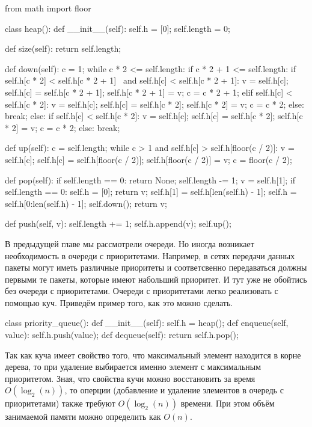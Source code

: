 \begin{python}
from math import floor

class heap():
	def __init__(self):
		self.h = [0];
		self.length = 0;

	def size(self):
		return self.length;

	def down(self):
		c = 1;
		while c * 2 <= self.length:
			if c * 2 + 1 <= self.length:
				if self.h[c * 2] < self.h[c * 2 + 1] \
					and self.h[c] < self.h[c * 2 + 1]:
					v = self.h[c];
					self.h[c] = self.h[c * 2 + 1];
					self.h[c * 2 + 1] = v;
					c = c * 2 + 1;
				elif self.h[c] < self.h[c * 2]:
					v = self.h[c];
					self.h[c] = self.h[c * 2];
					self.h[c * 2] = v;
					c = c * 2;
				else:
					break;
			else:
				if self.h[c] < self.h[c * 2]:
					v = self.h[c];
					self.h[c] = self.h[c * 2];
					self.h[c * 2] = v;
					c = c * 2;
				else:
					break;

	def up(self):
		c = self.length;
		while c > 1 and self.h[c] > self.h[floor(c / 2)]:
			v = self.h[c];
			self.h[c] = self.h[floor(c / 2)];
			self.h[floor(c / 2)] = v;
			c = floor(c / 2);

	def pop(self):
		if self.length == 0:
			return None;
		self.length -= 1;
		v = self.h[1];
		if self.length == 0:
			self.h = [0];
			return v;
		self.h[1] = self.h[len(self.h) - 1];
		self.h = self.h[0:len(self.h) - 1];
		self.down();
		return v;

	def push(self, v):
		self.length += 1;
		self.h.append(v);
		self.up();
\end{python}

В предыдущей главе мы рассмотрели очереди. Но иногда возникает необходимость
в очереди с приоритетами. Например, в сетях передачи данных пакеты могут 
иметь различные приоритеты и соответсвенно передаваться должны первыми те
пакеты, которые имеют набольший приоритет. И тут уже не обойтись без очереди 
с приоритетами. Очереди с приоритетами легко реализовать с помощью 
куч. Приведём пример того, как это можно сделать.

\begin{python}
class priority_queue():
	def __init__(self):
		self.h = heap();
	def enqueue(self, value):
		self.h.push(value);
	def dequeue(self):
		return self.h.pop();
\end{python}

Так как куча имеет свойство того, что максимальный элемент находится 
в корне дерева, то при удаление выбирается именно элемент с 
максимальным приоритетом. Зная, что свойства кучи можно восстановить
за время $O(\log_2(n))$, то оперции (добавление и удаление элементов 
в очередь с приоритетами) также требуют $O(\log_2(n))$ времени. При этом 
объём занимаемой памяти можно определить как $O(n)$.

